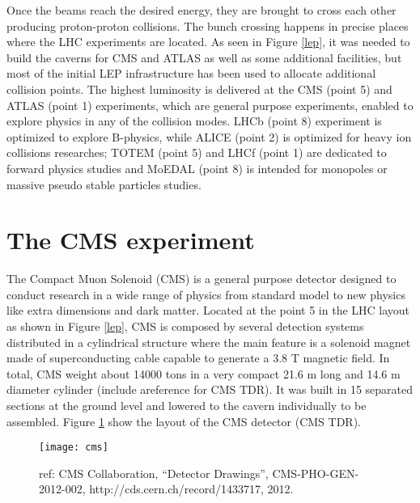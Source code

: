 

Once the beams reach the desired energy, they are brought to cross each other producing proton-proton collisions. The bunch crossing happens in precise places where the LHC experiments are located. As seen in Figure \ref{lep}, it was needed to build the caverns for CMS and ATLAS as well as some additional facilities, but most of the initial LEP infrastructure has been used to allocate additional collision points. The highest luminosity is delivered at the CMS (point 5) and ATLAS (point 1) experiments, which are general purpose experiments, enabled to explore physics in any of the collision modes. LHCb (point 8) experiment is optimized to explore B-physics, while ALICE (point 2) is optimized for heavy ion collisions researches; TOTEM (point 5) and LHCf (point 1) are dedicated to forward physics studies and MoEDAL (point 8) is intended for monopoles or massive pseudo stable particles studies.


\section{The CMS experiment}

The Compact Muon Solenoid (CMS) is a general purpose detector designed to conduct research in a wide range of physics from standard model to new physics like extra dimensions and dark matter. Located at the point 5 in the LHC layout as shown in Figure \ref{lep}, CMS is composed by several detection systems distributed in a cylindrical structure where the main feature is a solenoid magnet made of superconducting cable capable to generate a 3.8 T magnetic field. In total, CMS weight about 14000 tons in a very compact 21.6 m long and 14.6 m diameter cylinder (include areference for CMS TDR). It was built in 15 separated sections at the ground level and lowered to the cavern individually to be assembled. Figure \ref{cms} show the layout of the CMS detector (CMS TDR).          

\begin{figure}[!h]
  \centering
  \texttt{[image: cms]}
  \caption {ref: CMS Collaboration, ``Detector Drawings'', CMS-PHO-GEN-2012-002, http://cds.cern.ch/record/1433717, 2012. }\label{cms}
\end{figure}


